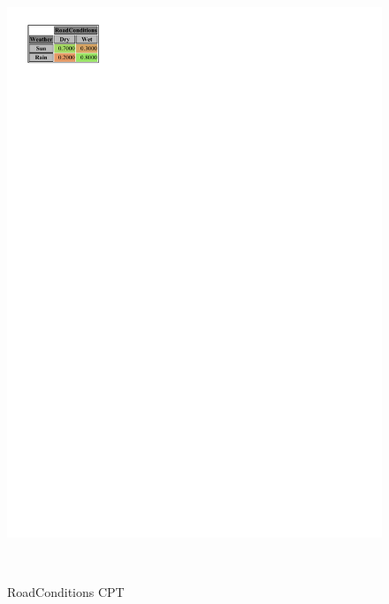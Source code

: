 \documentclass[a4paper,12pt]{article} %
\begin{document}
\begin{figure}[H]
\begin{center}
	\begin{minipage}[c]{.31\textwidth}
		\centering
		\includegraphics[width=.9\linewidth]{../code/roadconditions.pdf}	
		\caption*{RoadConditions CPT}
		\label{fig:roadconditions}
	\end{minipage}
	~
	\begin{minipage}[c]{.28\textwidth}
		\centering

\end{minipage}
\end{center}
\end{figure}
\end{document}
